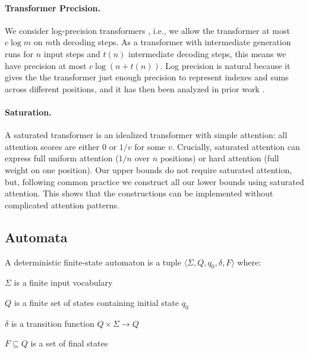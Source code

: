 
\paragraph{Transformer Precision.} We consider log-precision transformers \citep{merrill2023parallelism}, i.e., we allow the transformer at most $c \log m$ on $m$th decoding steps. As a transformer with intermediate generation runs for $n$ input steps and $t(n)$ intermediate decoding steps, this means we have precision at most $c \log(n + t(n))$.
Log precision is natural because it gives the the transformer just enough precision to represent indexes and sums across different positions, and it has then been analyzed in prior work \citep{perez2021attention,merrill2023parallelism,merrill2023logic}.

\paragraph{Saturation.} A saturated transformer \citep{merrill2021effects} is an idealized transformer with simple attention: all attention scores are either $0$ or $1/v$ for some $v$. Crucially, saturated attention can express full uniform attention ($1/n$ over $n$ positions) or hard attention (full weight on one position).
Our upper bounds do not require saturated attention, but, following common practice \citep{perez2021attention,merrill2023parallelism} we construct all our lower bounds using saturated attention. This shows that the constructions can be implemented without complicated attention patterns.

\subsection{Automata}

A deterministic finite-state automaton is a tuple $\langle \Sigma, Q, q_0, \delta, F \rangle$ where:

\begin{compactenum}
    \item $\Sigma$ is a finite input vocabulary
    \item $Q$ is a finite set of states containing initial state $q_0$
    \item $\delta$ is a transition function $Q \times \Sigma \to Q$
    \item $F \subseteq Q$ is a set of final states
\end{compactenum}

